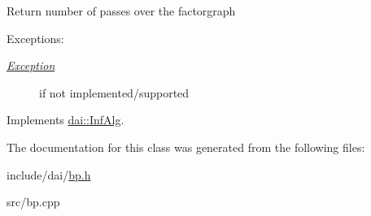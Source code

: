 Return number of passes over the factorgraph \begin{Desc}
\item[Exceptions:]
\begin{description}
\item[{\em \hyperlink{classdai_1_1Exception}{Exception}}]if not implemented/supported \end{description}
\end{Desc}


Implements \hyperlink{classdai_1_1InfAlg_7a93807863cc0a2025c1a78bdf1e14b8}{dai::InfAlg}.

The documentation for this class was generated from the following files:\begin{CompactItemize}
\item 
include/dai/\hyperlink{bp_8h}{bp.h}\item 
src/bp.cpp\end{CompactItemize}
